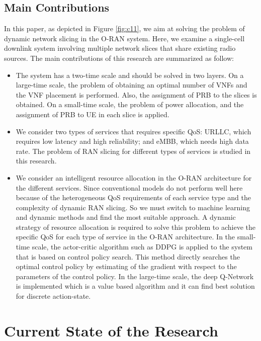 \documentclass[conference]{IEEEtran}
\begin{document}
\subsection{Main Contributions}
In this paper, as depicted in Figure \ref{fig:c11}, we aim at solving the problem of dynamic network slicing in the O-RAN system. 
Here, we examine a single-cell downlink system involving multiple network slices that share existing radio sources.
The main contributions of
this research are summarized as follow:
\begin{itemize}
\item 
The system has a two-time scale and should be solved in two layers. On a large-time scale, the problem of obtaining an optimal number of VNFs and the VNF placement is performed. Also, the assignment of PRB to the slices is obtained. On a small-time scale, the problem of power allocation, and the assignment of PRB to UE in each slice is applied.
\item 
We consider two types of services that requires specific QoS: URLLC, which requires low latency and high reliability; and eMBB, which needs high data rate.
The problem of RAN slicing for different types of services is studied in this research.

\item 
We consider an intelligent resource allocation in the O-RAN architecture for the different services. Since conventional models do not perform well here because of the heterogeneous QoS requirements of each service type and the complexity of dynamic RAN slicing. So we must switch to machine learning and dynamic methods and find the most suitable approach.  
A dynamic strategy of resource allocation is required to solve this problem to achieve the specific QoS for each type of service in the O-RAN architecture.
 In the small-time scale, the actor-critic algorithm such as DDPG is applied to the system that is based on control policy search. This method directly searches the optimal control policy
by estimating of the gradient with respect to the parameters
of the control policy. In the large-time scale, the deep Q-Network is implemented which is a value based algorithm and it can find best solution for discrete action-state.
\end{itemize}
\section{Current State of the Research}
\end{document}
